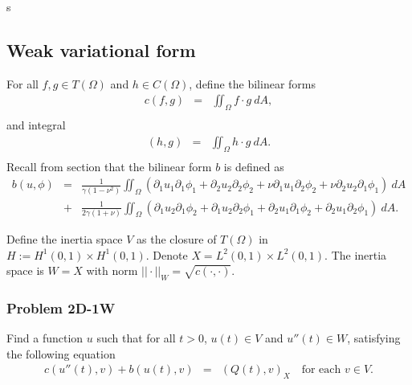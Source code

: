 s\documentclass[../../main.tex]{subfiles}
\begin{document}
\subsection{Weak variational form}
For all $f,g \in T(\Omega)$ and $h \in C(\Omega)$, define the bilinear forms
\begin{eqnarray*}
	c(f,g) & = & \iint_\Omega f \cdot g \ dA, \\
\end{eqnarray*}
and integral
\begin{eqnarray*}
	(h,g) & = & \iint_\Omega h \cdot g \ dA. \\
\end{eqnarray*}
Recall from section  that the bilinear form $b$ is defined as
\begin{eqnarray*}
	b(u,\phi) & = & \frac{1}{\gamma(1-\nu^2)}\iint_{\Omega} (\partial_1 u_1 \partial_1 \phi_1 + \partial_2 u_2 \partial _2 \phi_2 + \nu\partial_1 u_1 \partial_2\phi_2 + \nu \partial_2 u_2 \partial_1 \phi_1 ) \ dA \\
	& + & \frac{1}{2\gamma(1+\nu)}\iint_{\Omega} (\partial_1 u_2 \partial_1 \phi_2 + \partial_1 u_2 \partial_2 \phi_1 + \partial_2 u_1 \partial_1\phi_2 + \partial_2 u_1 \partial_2\phi_1) \ dA.
\end{eqnarray*}

Define the inertia space $V$ as the closure of $T(\Omega)$ in $H := H^1(0,1)\times H^1(0,1)$. Denote $X = L^2(0,1)\times L^2(0,1)$. The inertia space is $W  = X$ with norm $||\cdot||_W = \sqrt{c(\cdot,\cdot)}$.

\subsubsection{Problem 2D-1W}
Find a function $u$ such that for all $t>0$, $u(t) \in V$ and $u''(t) \in W$, satisfying the following equation
\begin{eqnarray}
	c(u''(t),v) + b(u(t),v) & = & (Q(t),v)_X \ \ \ \textrm{ for each } v \in V.
\end{eqnarray}
\end{document}
